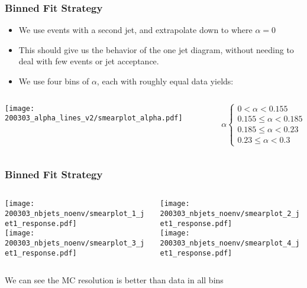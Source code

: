 \documentclass{beamer}
\begin{document}
\begin{frame}
  \frametitle{Binned Fit Strategy}

  \begin{itemize}
  \item We use events with a second jet, and extrapolate down to where $\alpha = 0$
  \item This should give us the behavior of the one jet diagram,
    without needing to deal with few events or jet acceptance.
  \item We use four bins of $\alpha$, each with roughly equal data yields:
  \end{itemize}
  \begin{columns}
    \begin{column}{0.5\linewidth}
      \texttt{[image: 200303\_alpha\_lines\_v2/smearplot\_alpha.pdf]}
    \end{column}
    \begin{column}{0.5\linewidth}
      \[
      \alpha
      \begin{cases}
        0 < \alpha < 0.155 \\
        0.155 \le \alpha < 0.185 \\
        0.185 \le \alpha < 0.23 \\
        0.23 \le \alpha < 0.3
      \end{cases}
      \]
    \end{column}
  \end{columns}

\end{frame}


\begin{frame}
  \frametitle{Binned Fit Strategy}

  \begin{columns}
    \begin{column}{0.3\linewidth}
      \centering
      \texttt{[image: 200303\_nbjets\_noenv/smearplot\_1\_jet1\_response.pdf]} \\
      \texttt{[image: 200303\_nbjets\_noenv/smearplot\_3\_jet1\_response.pdf]}
    \end{column}
    \begin{column}{0.3\linewidth}
      \centering
      \texttt{[image: 200303\_nbjets\_noenv/smearplot\_2\_jet1\_response.pdf]} \\
      \texttt{[image: 200303\_nbjets\_noenv/smearplot\_4\_jet1\_response.pdf]}
    \end{column}
  \end{columns}

  \vfill
  We can see the MC resolution is better than data in all bins

\end{frame}
\end{document}
